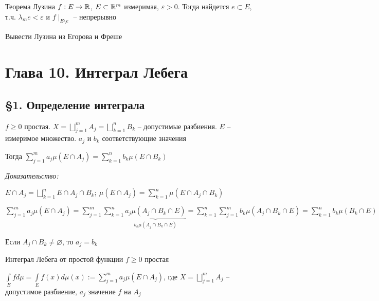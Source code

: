 \documentclass[12pt]{article}
\begin{document}
\begin{theo}{Теорема Лузина}
    $f : E \to \mathbb R$, $E \subset \mathbb R^m$ измеримая, $\varepsilon > 0$. Тогда найдется $e \subset E$, т.ч. $\lambda_m e < \varepsilon$ и $f\mid_{E \setminus e}$ -- непрерывно 
\end{theo}

\begin{Exercise}{}
    Вывести Лузина из Егорова и Фреше
\end{Exercise}

\newpage 

\section{Глава 10. Интеграл Лебега}

\subsection{\S 1. Определение интеграла}

\begin{lem}{}
    $f \geq 0$ простая. $X = \bigsqcup\limits_{j = 1}^m A_j = \bigsqcup\limits_{k = 1}^n B_k$ -- допустимые разбиения. $E$ -- измеримое множество. $a_j$ и $b_k$ соответствующие значения 

    Тогда $\sum\limits_{j = 1}^m a_j\mu (E \cap A_j) = \sum\limits_{k = 1}^n b_k \mu(E \cap B_k)$
\end{lem}

\textit{Доказательство:}

$E \cap A_j = \bigsqcup\limits_{k = 1}^n E \cap A_j \cap B_k;\ \mu(E \cap A_j) = \sum\limits_{k = 1}^n \mu(E \cap A_j \cap B_k)$

$\sum\limits_{j = 1}^m a_j \mu(E \cap A_j) = \sum\limits_{j = 1}^m \sum\limits_{k = 1}^n \underbrace{a_j \mu(A_j \cap B_k \cap E)}_{b_k \mu(A_j \cap B_k \cap E)} = \sum\limits_{k = 1}^n \sum\limits_{j = 1}^m b_k \mu(A_j \cap B_k \cap E) = \sum\limits_{k = 1}^n b_k \mu(B_k \cap E)$

Если $A_j \cap B_k \neq \varnothing$, то $a_j = b_k$

\begin{defin}{Интеграл Лебега от простой функции}
    $f \geq 0$ простая 

    $\int\limits_E fd\mu = \int\limits_E f(x)d\mu(x) := \sum\limits_{j = 1}^m a_j\mu(E \cap A_j)$, где $X = \bigsqcup\limits_{j = 1}^m A_j$ -- допустимое разбиение, $a_j$ значение $f$ на $A_j$
\end{defin}
\end{document}

